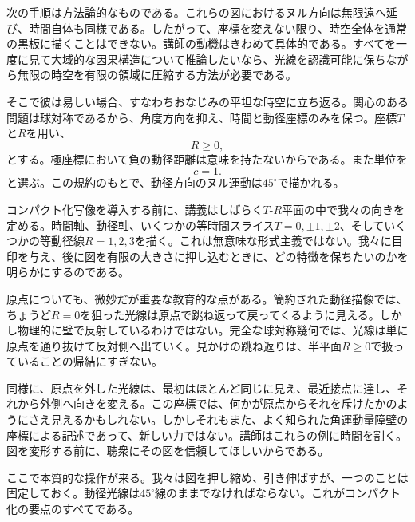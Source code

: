次の手順は方法論的なものである。これらの図におけるヌル方向は無限遠へ延び、時間自体も同様である。したがって、座標を変えない限り、時空全体を通常の黒板に描くことはできない。講師の動機はきわめて具体的である。すべてを一度に見て大域的な因果構造について推論したいなら、光線を認識可能に保ちながら無限の時空を有限の領域に圧縮する方法が必要である。

そこで彼は易しい場合、すなわちおなじみの平坦な時空に立ち返る。関心のある問題は球対称であるから、角度方向を抑え、時間と動径座標のみを保つ。座標\(T\)と\(R\)を用い、
\[
R\ge 0,
\]
とする。極座標において負の動径距離は意味を持たないからである。また単位を
\[
c=1.
\]
と選ぶ。この規約のもとで、動径方向のヌル運動は\(45^\circ\)で描かれる。

コンパクト化写像を導入する前に、講義はしばらく\(T\)-\(R\)平面の中で我々の向きを定める。時間軸、動径軸、いくつかの等時間スライス\(T=0,\pm1,\pm2\)、そしていくつかの等動径線\(R=1,2,3\)を描く。これは無意味な形式主義ではない。我々に目印を与え、後に図を有限の大きさに押し込むときに、どの特徴を保ちたいのかを明らかにするのである。

原点についても、微妙だが重要な教育的な点がある。簡約された動径描像では、ちょうど\(R=0\)を狙った光線は原点で跳ね返って戻ってくるように見える。しかし物理的に壁で反射しているわけではない。完全な球対称幾何では、光線は単に原点を通り抜けて反対側へ出ていく。見かけの跳ね返りは、半平面\(R\ge 0\)で扱っていることの帰結にすぎない。

同様に、原点を外した光線は、最初はほとんど同じに見え、最近接点に達し、それから外側へ向きを変える。この座標では、何かが原点からそれを斥けたかのようにさえ見えるかもしれない。しかしそれもまた、よく知られた角運動量障壁の座標による記述であって、新しい力ではない。講師はこれらの例に時間を割く。図を変形する前に、聴衆にその図を信頼してほしいからである。

ここで本質的な操作が来る。我々は図を押し縮め、引き伸ばすが、一つのことは固定しておく。動径光線は\(45^\circ\)線のままでなければならない。これがコンパクト化の要点のすべてである。

\begin{classroomqa}
\end{classroomqa}

